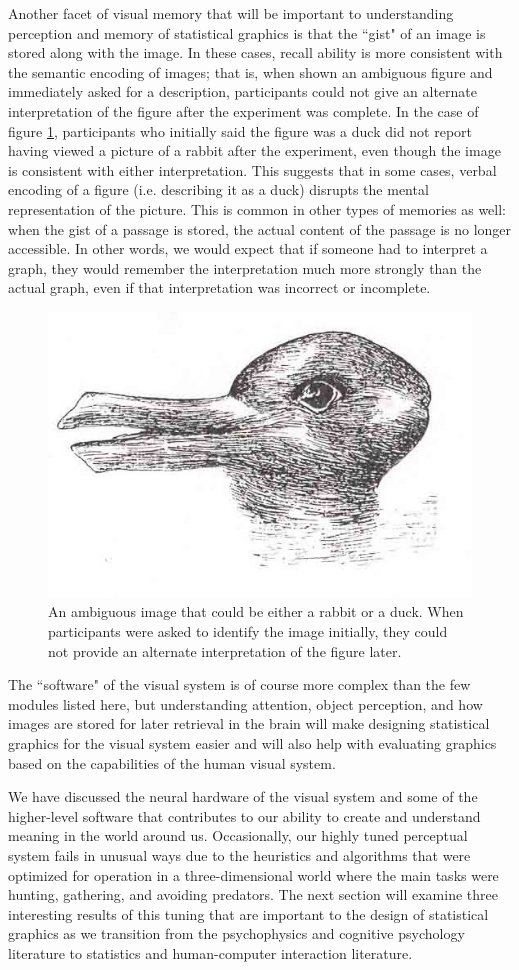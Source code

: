 \documentclass[11pt]{isuthesis}\usepackage[]{graphicx}\usepackage[]{color}
\begin{document}
Another facet of visual memory that will be important to understanding perception and memory of statistical graphics is that the ``gist" of an image is stored along with the image. In these cases, recall ability is more consistent with the semantic encoding of images; that is, when shown an ambiguous figure and immediately asked for a description, participants could not give an alternate interpretation of the figure after the experiment was complete. In the case of  figure \ref{fig:ambiguousrabbit}, participants who initially said the figure was a duck did not report having viewed a picture of a rabbit after the experiment, even though the image is consistent with either interpretation. This suggests that in some cases, verbal encoding of a figure (i.e. describing it as a duck) disrupts the mental representation of the picture. This is common in other types of memories as well: when the gist of a passage is stored, the actual content of the passage is no longer accessible. In other words, we would expect that if someone had to interpret a graph, they would remember the interpretation much more strongly than the actual graph, even if that interpretation was incorrect or incomplete. 

\begin{figure}[htbp]\centering
\includegraphics[width=.4\textwidth]{DuckRabbitIllusion}
\caption[Ambiguous Images]{An ambiguous image that could be either a rabbit or a duck. When participants were asked to identify the image initially, they could not provide an alternate interpretation of the figure later.}\label{fig:ambiguousrabbit}
\end{figure}

The ``software" of the visual system is of course more complex than the few modules listed here, but understanding attention, object perception, and how images are stored for later retrieval in the brain will make designing statistical graphics for the visual system easier and will also help with evaluating graphics based on the capabilities of the human visual system. 

We have discussed the neural hardware of the visual system and some of the higher-level software that contributes to our ability to create and understand meaning in the world around us. Occasionally, our highly tuned perceptual system fails in unusual ways due to the heuristics and algorithms that were optimized for operation in a three-dimensional world where the main tasks were hunting, gathering, and avoiding predators. The next section will examine three interesting results of this tuning that are important to the design of statistical graphics as we transition from the psychophysics and cognitive psychology literature to statistics and human-computer interaction literature. 
\end{document}
